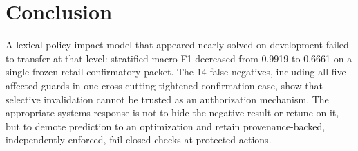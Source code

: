 \documentclass{article}
\begin{document}
\section{Conclusion}

A lexical policy-impact model that appeared nearly solved on development failed to transfer at that level: stratified macro-F1 decreased from 0.9919 to 0.6661 on a single frozen retail confirmatory packet. The 14 false negatives, including all five affected guards in one cross-cutting tightened-confirmation case, show that selective invalidation cannot be trusted as an authorization mechanism. The appropriate systems response is not to hide the negative result or retune on it, but to demote prediction to an optimization and retain provenance-backed, independently enforced, fail-closed checks at protected actions.



\end{document}
